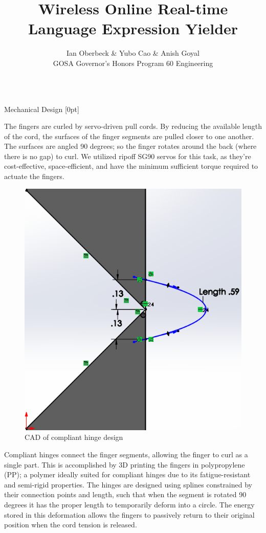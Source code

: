 \documentclass[final, 20pt]{beamer}
\title{Wireless Online Real-time Language Expression Yielder}
\author{Ian Oberbeck \& Yubo Cao \& Anish Goyal \\\normalfont\selectfont GOSA Governor's Honors Program 60 Engineering}
\newlength{\colwidth}
\begin{document}
\begin{frame}[t]
  \centering
  \begin{columns}[t]
    \margincolumn

    \begin{column}{\colwidth}
      \begin{block}{Mechanical Design}
        [0pt]

        The fingers are curled by servo-driven pull cords. By reducing the available length of the cord, the surfaces of the finger segments are pulled closer to one another. The surfaces are angled 90 degrees; so the finger rotates around the back (where there is no gap) to curl. We utilized ripoff SG90 servos for this task, as they're cost-effective, space-efficient, and have the minimum sufficient torque required to actuate the fingers.

        \begin{figure}
          \centering
          \includegraphics[width=0.75\linewidth]{images/compliant-hinge.png}
          \caption{CAD of compliant hinge design}
          \label{fig:compliant-hinge}
        \end{figure}

        Compliant hinges connect the finger segments, allowing the finger to curl as a single part. This is accomplished by 3D printing the fingers in polypropylene (PP); a polymer ideally suited for compliant hinges due to its fatigue-resistant and semi-rigid properties. The hinges are designed using splines constrained by their connection points and length, such that when the segment is rotated 90 degrees it has the proper length to temporarily deform into a circle. The energy stored in this deformation allows the fingers to passively return to their original position when the cord tension is released.
      \end{block}
    \end{column}


\end{columns}
\end{frame}
\end{document}

